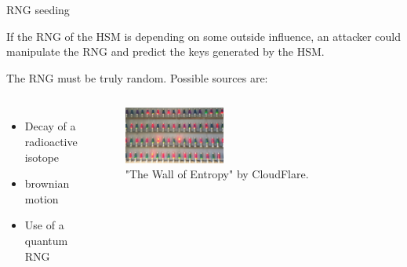 \begin{frame}{RNG seeding}
    \begin{wide}
        \begin{block}[Attack]
            If the RNG of the HSM is depending on some outside influence, an attacker could manipulate the RNG and predict the keys generated by the HSM.
        \end{block}
        \begin{block}[Defense]
            The RNG must be truly random. Possible sources are:
            \begin{columns}[c]
                \begin{itemize}
                    \item Decay of a radioactive isotope
                    \item brownian motion
                    \item Use of a quantum RNG
                \end{itemize}
                        \begin{figure}
                            \centering
                            \includegraphics[width=0.4\textwidth]{figures/lava-lamps.jpg}
                            \caption{"The Wall of Entropy" by CloudFlare\footnotemark[3].}
                        \end{figure}

                \end{columns}
        \end{block}
    \end{wide}
\end{frame}